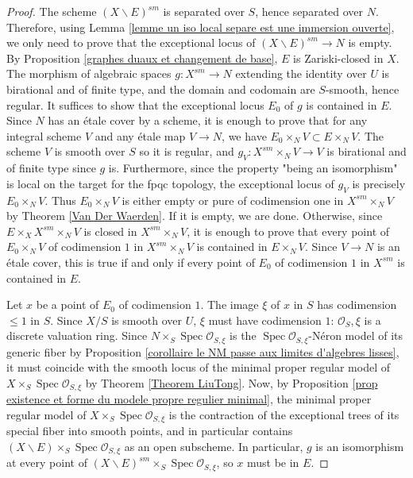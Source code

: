 \documentclass[a4paper,10pt,twoside]{article}
\newcommand{\ra}{\rightarrow}
\renewcommand{\O}{\mathcal{O}}
\DeclareMathOperator{\spec}{Spec}
\theoremstyle{definition}
\theoremstyle{remark}
\begin{document}
\begin{proof}
The scheme $(X\backslash E)^{sm}$ is separated over $S$, hence separated over $N$. Therefore, using Lemma \ref{lemme un iso local separe est une immersion ouverte}, we only need to prove that the exceptional locus of $(X\backslash E)^{sm}\ra N$ is empty. By Proposition \ref{graphes duaux et changement de base}, $E$ is Zariski-closed in $X$. The morphism of algebraic spaces $g:X^{sm}\ra N$ extending the identity over $U$ is birational and of finite type, and the domain and codomain are $S$-smooth, hence regular. It suffices to show that the exceptional locus $E_0$ of $g$ is contained in $E$. Since $N$ has an étale cover by a scheme, it is enough to prove that for any integral scheme $V$ and any étale map $V \rightarrow N$, we have $E_0\times_N V\subset E\times_N V$. The scheme $V$ is smooth over $S$ so it is regular, and $g_V:X^{sm}\times_N V\ra V$ is birational and of finite type since $g$ is. Furthermore, since the property "being an isomorphism" is local on the target for the fpqc topology, the exceptional locus of $g_V$ is precisely $E_0\times_N V$. Thus $E_0\times_N V$ is either empty or pure of codimension one in $X^{sm}\times_N V$ by Theorem \ref{Van Der Waerden}. If it is empty, we are done. Otherwise, since $E\times_X X^{sm}\times_N V$ is closed in $X^{sm}\times_N V$, it is enough to prove that every point of $E_0\times_N V$ of codimension $1$ in $X^{sm}\times_N V$ is contained in $E\times_N V$. Since $V\ra N$ is an \'etale cover, this is true if and only if every point of $E_0$ of codimension $1$ in $X^{sm}$ is contained in $E$.

Let $x$ be a point of $E_0$ of codimension $1$. The image $\xi$ of $x$ in $S$ has codimension $\leq 1$ in $S$. Since $X/S$ is smooth over $U$, $\xi$ must have codimension $1$: $\O_S,\xi$ is a discrete valuation ring. Since $N\times_S\spec\O_{S,\xi}$ is the $\spec\O_{S,\xi}$-N\'eron model of its generic fiber by Proposition \ref{corollaire le NM passe aux limites d'algebres lisses}, it must coincide with the smooth locus of the minimal proper regular model of $X\times_S\spec\O_{S,\xi}$ by Theorem \ref{Theorem LiuTong}. Now, by Proposition \ref{prop existence et forme du modele propre regulier minimal}, the minimal proper regular model of $X\times_S\spec\O_{S,\xi}$ is the contraction of the exceptional trees of its special fiber into smooth points, and in particular contains $(X\backslash E)\times_S\spec\O_{S,\xi}$ as an open subscheme. In particular, $g$ is an isomorphism at every point of $(X\backslash E)^{sm}\times_S\spec\O_{S,\xi}$, so $x$ must be in $E$.
\end{proof}
\end{document}

